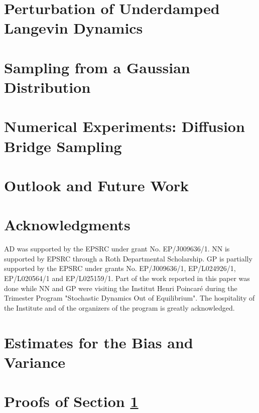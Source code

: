 \documentclass[onecollarge]{svjour2}       %
\begin{document}
\section{Perturbation of Underdamped Langevin Dynamics}
\label{sec:perturbed_langevin}


\section{Sampling from a Gaussian Distribution}
\label{sec:Gaussian}


%

\section{Numerical Experiments: Diffusion Bridge Sampling}
\label{sec:numerics}



\section{Outlook and Future Work}
\label{sec:outlook}


\section*{Acknowledgments}
 AD was supported by the EPSRC under grant No. EP/J009636/1. NN is supported by EPSRC through a Roth Departmental Scholarship. GP is partially supported by the EPSRC under grants No. EP/J009636/1, EP/L024926/1, EP/L020564/1 and EP/L025159/1. Part of the work reported in this paper was done while NN and GP were visiting the Institut Henri Poincar\'{e} during the Trimester Program "Stochastic Dynamics Out of Equilibrium". The hospitality of the Institute and of the organizers of the program is greatly acknowledged. 

\appendix
\section{Estimates for the Bias and Variance}
\label{app:proofs}



\section{Proofs of Section \ref{sec:perturbed_langevin}}
\label{app:hypocoercivity}

\end{document}
